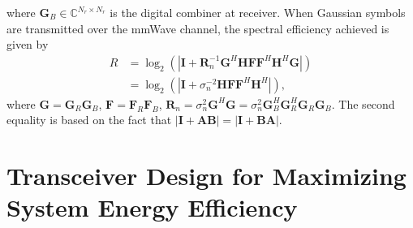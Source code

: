 \documentclass[11pt,draftcls,onecolumn]{IEEEtran}
\begin{document}
where $\bm{G}_{B}\in \mathbb{C}^{N_{r}\times N_{r}}$ is the digital combiner at receiver. When Gaussian symbols are transmitted over the mmWave channel, the spectral efficiency achieved is given by~\cite{JSACGold2003,BookTse2005}
\begin{subequations}\label{SplitBeam06}
\begin{align}
R&=\log_{2}\left(\left|\bm{I}+\bm{R}_{n}^{-1}\bm{G}^{H}\bm{H}\bm{F}
\bm{F}^{H}\bm{H}^{H}\bm{G}\right|\right)\label{SplitBeam06a}\\
&=\log_{2}\left(\left|\bm{I}+\sigma_{n}^{-2}\bm{H}\bm{F}\bm{F}^{H}\bm{H}^{H}\right|\right),\label{SplitBeam06b}
\end{align}
\end{subequations}
where $\bm{G}=\bm{G}_{R}\bm{G}_{B}$, $\bm{F}=\bm{F}_{R}\bm{F}_{B}$, $\bm{R}_{n}=\sigma_{n}^{2}\bm{G}^{H}\bm{G}=\sigma_{n}^{2}\bm{G}_{B}^{H}\bm{G}_{R}^{H}\bm{G}_{R}\bm{G}_{B}$. The second equality is based on the
fact that $\left|\bm{I}+\bm{A}\bm{B}\right|=\left|\bm{I}+\bm{B}\bm{A}\right|$.



\section{Transceiver Design for Maximizing System Energy Efficiency}\label{TransceiverDesign}
\end{document}
